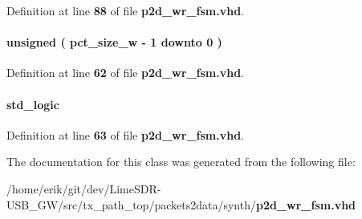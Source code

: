 Definition at line {\bf 88} of file {\bf p2d\+\_\+wr\+\_\+fsm.\+vhd}.

\paragraph[{wr\+\_\+cnt}]{ {\bfseries \textcolor{comment}{unsigned}\textcolor{vhdlchar}{ }\textcolor{vhdlchar}{(}\textcolor{vhdlchar}{ }\textcolor{vhdlchar}{ }\textcolor{vhdlchar}{ }\textcolor{vhdlchar}{ }{\bfseries {\bf pct\+\_\+size\+\_\+w}} \textcolor{vhdlchar}{-\/}\textcolor{vhdlchar}{ } \textcolor{vhdldigit}{1} \textcolor{vhdlchar}{ }\textcolor{keywordflow}{downto}\textcolor{vhdlchar}{ }\textcolor{vhdlchar}{ } \textcolor{vhdldigit}{0} \textcolor{vhdlchar}{ }\textcolor{vhdlchar}{)}\textcolor{vhdlchar}{ }} \hspace{0.3cm}{\ttfamily [Signal]}}\label{classp2d__wr__fsm_1_1arch_a401f4b5428c8def7541529eaec78677b}


Definition at line {\bf 62} of file {\bf p2d\+\_\+wr\+\_\+fsm.\+vhd}.

\paragraph[{wr\+\_\+cnt\+\_\+end}]{ {\bfseries \textcolor{comment}{std\+\_\+logic}\textcolor{vhdlchar}{ }} \hspace{0.3cm}{\ttfamily [Signal]}}\label{classp2d__wr__fsm_1_1arch_abc7147147601e68e6902bf8e996b0fde}


Definition at line {\bf 63} of file {\bf p2d\+\_\+wr\+\_\+fsm.\+vhd}.



The documentation for this class was generated from the following file\+:\begin{DoxyCompactItemize}
\item 
/home/erik/git/dev/\+Lime\+S\+D\+R-\/\+U\+S\+B\+\_\+\+G\+W/src/tx\+\_\+path\+\_\+top/packets2data/synth/{\bf p2d\+\_\+wr\+\_\+fsm.\+vhd}\end{DoxyCompactItemize}
